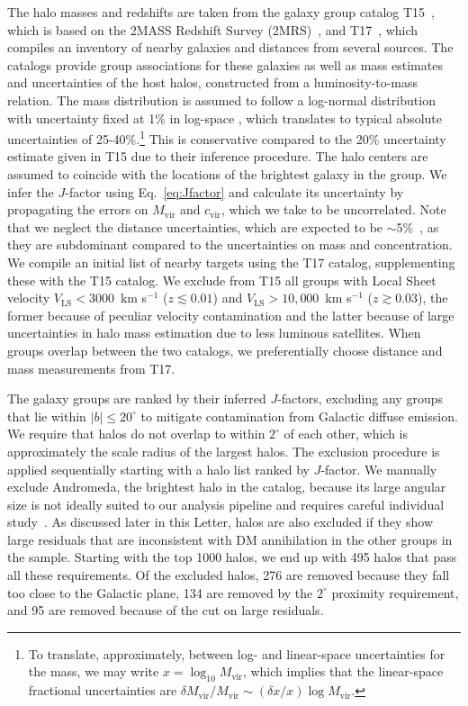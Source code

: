 The halo masses and redshifts are taken from the galaxy group catalog T15~\cite{Tully:2015opa}, which is based on the 2MASS Redshift Survey (2MRS)~\cite{Crook:2006sw}, and T17~\cite{2017ApJ...843...16K}, which compiles an inventory of nearby galaxies and distances from several sources.  The catalogs provide group associations for these galaxies as well as mass estimates and uncertainties of the host halos, constructed from a luminosity-to-mass relation. The mass distribution is assumed to follow a log-normal distribution with uncertainty fixed at 1\% in log-space \cite{companion}, which translates to typical absolute uncertainties of 25-40\%.\footnote{To translate, approximately, between log- and linear-space uncertainties for the mass, we may write $x = \log_{10} M_\text{vir}$, which implies that the linear-space fractional uncertainties are $\delta M_\text{vir} / M_\text{vir} \sim (\delta x / x) \log M_\text{vir}$. } This is conservative compared to the 20\% uncertainty estimate given in T15 due to their inference procedure. The halo centers are assumed to coincide with the locations of the brightest galaxy in the group.  We infer the $J$-factor using Eq.~\ref{eq:Jfactor} and calculate its uncertainty by propagating the errors on $M_\text{vir}$ and $c_\text{vir}$, which we take to be uncorrelated.  Note that we neglect the distance uncertainties, which are expected to be $\sim$5\%~\cite{Tully:2016ppz,2017ApJ...843...16K}, as they are subdominant compared to the uncertainties on mass and concentration.  We compile an initial list of nearby targets using the T17 catalog, supplementing these with the T15 catalog.  We exclude from T15 all groups with Local Sheet velocity $V_\text{LS} < 3000$~km s$^{-1}$ ($z \lesssim 0.01$) and $V_\text{LS} > 10,000$~km s$^{-1}$ ($z \gtrsim 0.03$), the former because of peculiar velocity contamination and the latter because of large uncertainties in halo mass estimation due to less luminous satellites.  When groups overlap between the two catalogs, we preferentially choose distance and mass measurements from T17.

The galaxy groups are ranked by their inferred $J$-factors, excluding any groups that lie within $|b| \leq 20^\circ$ to mitigate contamination from Galactic diffuse emission.  We require that halos do not overlap to within $2^\circ$ of each other, which is approximately the scale radius of the largest halos.  The exclusion procedure is applied sequentially starting with a halo list ranked by $J$-factor.  We manually exclude Andromeda, the brightest halo in the catalog, because its large angular size is not ideally suited to our analysis pipeline and requires careful individual study~\cite{Ackermann:2017nya}.  
As discussed later in this Letter, halos are also excluded if they show large residuals that are inconsistent with DM annihilation in the other groups in the sample.  Starting with the top 1000 halos, we end up with 495 halos that pass all these requirements.  Of the excluded halos, 276 are removed because they fall too close to the Galactic plane, 134 are removed by the $2^\circ$ proximity requirement, and 95 are removed because of the cut on large residuals. 

